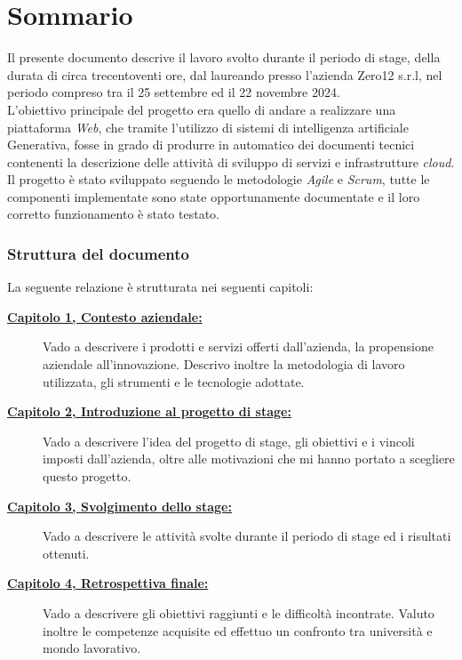 \cleardoublepage
{}
{}
\begingroup
\let\clearpage\relax
\let\cleardoublepage\relax
\let\cleardoublepage\relax

\chapter*{Sommario}

\small 
Il presente documento descrive il lavoro svolto durante il periodo di stage, della durata di circa trecentoventi ore, dal laureando \myName presso l'azienda Zero12 s.r.l, 
nel periodo compreso tra il 25 settembre ed il 22 novembre 2024. \\
L'obiettivo principale del progetto era quello di andare a realizzare una piattaforma \textit{Web}, che tramite l'utilizzo di sistemi di intelligenza artificiale Generativa, 
fosse in grado di produrre in automatico dei documenti tecnici contenenti la descrizione delle attività di sviluppo di servizi e infrastrutture \textit{cloud}. \\
Il progetto è stato sviluppato seguendo le metodologie \textit{Agile} e \textit{Scrum}, tutte le componenti implementate sono state opportunamente documentate e 
il loro corretto funzionamento è stato testato.\\ 

\subsection*{Struttura del documento}
La seguente relazione è strutturata nei seguenti capitoli:
\begin{description}
    \item[{\hyperref[cap:contesto-aziendale]{\textbf{Capitolo 1, Contesto aziendale:}}}]  Vado a descrivere i prodotti e servizi offerti dall'azienda, la propensione aziendale all'innovazione.
        Descrivo inoltre la metodologia di lavoro utilizzata, gli strumenti e le tecnologie adottate.
    \item[{\hyperref[cap:introduzione-al-progetto]{\textbf{Capitolo 2, Introduzione al progetto di stage:}}}] Vado a descrivere l'idea del progetto di stage, gli obiettivi e i vincoli imposti dall'azienda, oltre alle motivazioni che mi hanno portato a scegliere questo progetto.
    \item[{\hyperref[cap:svolgimento-dello-stage]{\textbf{Capitolo 3, Svolgimento dello stage:}}}] Vado a descrivere le attività svolte durante il periodo di stage ed i risultati ottenuti.
    \item[{\hyperref[cap:retrospettiva-finale]{\textbf{Capitolo 4, Retrospettiva finale:}}}] Vado a descrivere gli obiettivi raggiunti e le difficoltà incontrate.
    Valuto inoltre le competenze acquisite ed effettuo un confronto tra università e mondo lavorativo.
\end{description}

